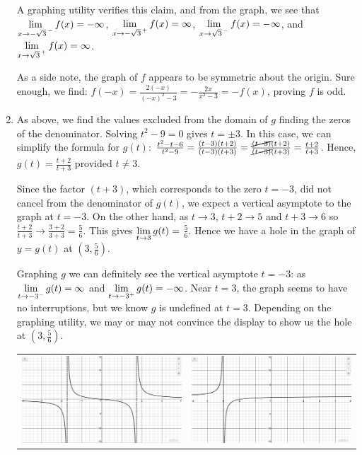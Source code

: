 \begin{ex}
\begin{enumerate}
A graphing utility verifies this claim, and from the graph, we see that  $\ds{\lim_{x \rightarrow -\sqrt{3}^{\, -}} f(x) = -\infty}$, $\ds{\lim_{x \rightarrow -\sqrt{3}^{\, +}} f(x) = \infty}$, $\ds{\lim_{x \rightarrow \sqrt{3}^{\, -}} f(x) = -\infty}$, and $\ds{\lim_{x \rightarrow \sqrt{3}^{\, +}} f(x) = \infty}$.

As a side note, the graph of $f$ appears to be symmetric about the origin.  Sure enough, we find: $f(-x) = \frac{2(-x)}{(-x)^2-3} = -\frac{2x}{x^2-3} = -f(x)$, proving $f$ is odd.

\item  As above, we find the values excluded from the domain of $g$ finding the zeros of the denominator.  Solving $t^2 - 9 = 0$ gives $t = \pm 3$.  In this case, we can simplify the formula for $g(t)$:  $\frac{t^2-t-6}{t^2-9} = \frac{(t-3)(t+2)}{(t-3)(t+3)} =\frac{\cancel{(t-3)}(t+2)}{\cancel{(t-3)}(t+3)} =  \frac{t+2}{t+3}$.   Hence, $g(t) = \frac{t+2}{t+3}$ provided $t \neq 3$.  

Since the factor $(t+3)$, which corresponds to the zero $t = -3$, did not cancel from the denominator of $g(t)$, we expect a vertical asymptote to the graph at $t = -3$.  On the other hand, as $t \rightarrow 3$, $t+2 \rightarrow 5$ and $t+3 \rightarrow 6$ so $\frac{t+2}{t+3} \rightarrow \frac{3+2}{3+3} = \frac{5}{6}$.  This gives $\ds{\lim_{t \rightarrow 3} g(t)} =$  $\frac{5}{6}$.   Hence we have a hole in the graph of $y = g(t)$ at  $\left(3, \frac{5}{6}\right)$.

 Graphing $g$ we can definitely see the vertical asymptote $t=-3$:  as  $\ds{\lim_{t \rightarrow -3^{-}} g(t) = \infty}$ and $\ds{\lim_{t \rightarrow -3^{+}} g(t) = -\infty}$.  Near $t=3$, the graph seems to have no interruptions, but we know $g$ is undefined at $t=3$.  Depending on the graphing utility, we may or may not convince the display to show us the hole at $\left(3, \frac{5}{6}\right)$.

\begin{center}

\begin{tabular}{cc}

\includegraphics[width=3in]{./IntroRationalGraphics/VAorHoleEx01.jpg} & \includegraphics[width=3in]{./IntroRationalGraphics/VAorHoleEx02.jpg} \\


\end{tabular}
\end{center}
\end{enumerate}
\end{ex}
